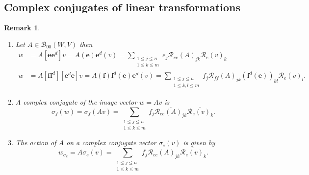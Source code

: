 \documentclass[aps,preprint]{revtex4}%
\newtheorem{remark}[theorem]{Remark}
\begin{document}
\subsection{Complex conjugates of linear transformations}

\begin{remark}
\begin{enumerate}
\item Let $A\in\mathcal{B}_{00}\left(  W,V\right)  $ then
\begin{align}
w  &  =A\left[  \boldsymbol{ee}^{d}\right]  v=A\left(  \boldsymbol{e}\right)
\boldsymbol{e}^{d}\left(  v\right)  =\sum_{\substack{1\leq j\leq n\\1\leq
k\leq m}}e_{j}\mathcal{R}_{ee}\left(  A\right)  _{jk}\mathcal{R}_{e}\left(
v\right)  _{k}\\
w  &  =A\left[  \boldsymbol{ff}^{d}\right]  \left[  \boldsymbol{e}%
^{d}\boldsymbol{e}\right]  v=A\left(  \boldsymbol{f}\right)  \boldsymbol{f}%
^{d}\left(  \boldsymbol{e}\right)  \boldsymbol{e}^{d}\left(  v\right)
=\sum_{\substack{1\leq j\leq n\\1\leq k,l\leq m}}f_{j}\mathcal{R}_{ff}\left(
A\right)  _{jk}\left(  \boldsymbol{f}^{d}\left(  \boldsymbol{e}\right)
\right)  _{kl}\mathcal{R}_{e}\left(  v\right)  _{l}.
\end{align}


\item A complex conjugate of the image vector $w=Av$ is
\begin{equation}
\mathcal{\sigma}_{f}\left(  w\right)  =\mathcal{\sigma}_{f}\left(  Av\right)
=\sum_{\substack{1\leq j\leq n\\1\leq k\leq m}}f_{j}\overline{\mathcal{R}%
_{ee}\left(  A\right)  _{jk}}\overline{\mathcal{R}_{e}\left(  v\right)  _{k}}.
\end{equation}


\item The action of $A$ on a complex conjugate vector $\mathcal{\sigma}%
_{e}\left(  v\right)  $ is given by
\begin{equation}
w_{\mathcal{\sigma}_{e}}=A\mathcal{\sigma}_{e}\left(  v\right)  =\sum
_{\substack{1\leq j\leq n\\1\leq k\leq m}}f_{j}\mathcal{R}_{ee}\left(
A\right)  _{jk}\overline{\mathcal{R}_{e}\left(  v\right)  _{k}}.
\end{equation}



\end{enumerate}
\end{remark}
\end{document}
